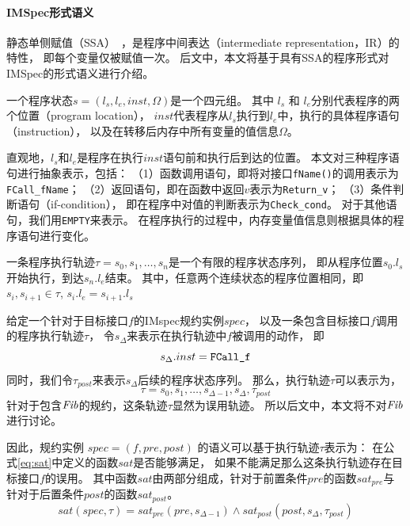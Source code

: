 \paragraph{IMSpec形式语义}
静态单侧赋值（SSA）~\cite{ssa}，是程序中间表达（intermediate representation，IR）的特性，
即每个变量仅被赋值一次。
后文中，本文将基于具有SSA的程序形式对IMSpec的形式语义进行介绍。

\begin{definition}[程序状态]
	一个程序状态$s = (l_s, l_e, inst, \Omega)$是一个四元组。
	其中 $l_s$ 和 $l_e$分别代表程序的两个位置（program location）， 
	$inst$代表程序从$l_s$执行到$l_e$中，执行的具体程序语句（instruction），
	以及在转移后内存中所有变量的值信息$\Omega$。
\end{definition}

直观地，$l_s$和$l_e$是程序在执行$inst$语句前和执行后到达的位置。
本文对三种程序语句进行抽象表示，包括：
（1）函数调用语句，即将对接口\texttt{fName()}的调用表示为\texttt{FCall\_fName}；
（2）返回语句，即在函数中返回$v$表示为\texttt{Return\_v}；
（3）条件判断语句（if-condition），
即在程序中对值的判断表示为\texttt{Check\_cond}。
对于其他语句，我们用\texttt{EMPTY}来表示。
在程序执行的过程中，内存变量值信息则根据具体的程序语句进行变化。

\begin{definition}[执行轨迹]
	一条程序执行轨迹$\tau = s_0, s_1, \dots, s_n$是一个有限的程序状态序列，
	即从程序位置$s_0.l_s$开始执行，到达$s_n.l_e$结束。
	其中，任意两个连续状态的程序位置相同，即$s_i, s_{i+1} \in \tau$, $s_i.l_e = s_{i+1}.l_s$
\end{definition}

给定一个针对于目标接口$f$的IMspec规约实例$\mathit{spec}$，
以及一条包含目标接口$f$调用的程序执行轨迹$\tau$，
令$s_{\Delta}$来表示在执行轨迹中$f$被调用的动作，
即$$s_{\Delta}.inst = \text{\texttt{FCall\_f}}$$
同时，我们令$\tau_{post}$来表示$s_{\Delta}$后续的程序状态序列。
那么，执行轨迹$\tau$可以表示为，
$$\tau = s_0, s_1, \dots, s_{\Delta-1}, s_{\Delta}, \tau_{post}$$
针对于包含$\mathit{Fib}$的规约，这条轨迹$\tau$显然为误用轨迹。
所以后文中，本文将不对$\mathit{Fib}$进行讨论。

因此，规约实例
$\mathit{spec} = (f, \mathit{pre}, \mathit{post})$
的语义可以基于执行轨迹$\tau$表示为：
在公式\ref{eq:sat}中定义的函数$sat$是否能够满足，
如果不能满足那么这条执行轨迹存在目标接口$f$的误用。
其中函数$sat$由两部分组成，针对于前置条件$\mathit{pre}$的函数$sat_{pre}$与
针对于后置条件$\mathit{post}$的函数$sat_{post}$。
\begin{equation}
\label{eq:sat}
sat(\textit{spec}, \tau) = 
sat_{pre}(\mathit{pre},
s_{\Delta-1}) \wedge sat_{post}(\mathit{post},s_{\Delta},\tau_{post})
\end{equation}

